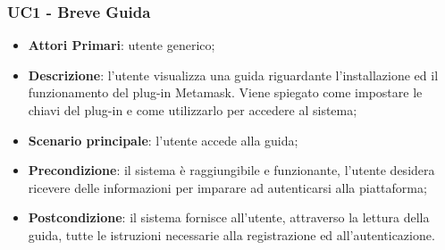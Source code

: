 \subsubsection{UC1 - Breve Guida}
\begin{itemize}
	\item \textbf{Attori Primari}: utente generico;
	\item \textbf{Descrizione}: l'utente visualizza una guida riguardante l'installazione ed il funzionamento del plug-in Metamask\glo. Viene spiegato come impostare le chiavi del plug-in e come utilizzarlo per accedere al sistema;
	\item \textbf{Scenario principale}: l'utente accede alla guida;
	\item \textbf{Precondizione}: il sistema è raggiungibile e funzionante, l'utente desidera ricevere delle informazioni per imparare ad autenticarsi alla piattaforma;
	\item \textbf{Postcondizione}: il sistema fornisce all'utente, attraverso la lettura della guida, tutte le istruzioni necessarie alla registrazione ed all'autenticazione.
	
	
\end{itemize}
